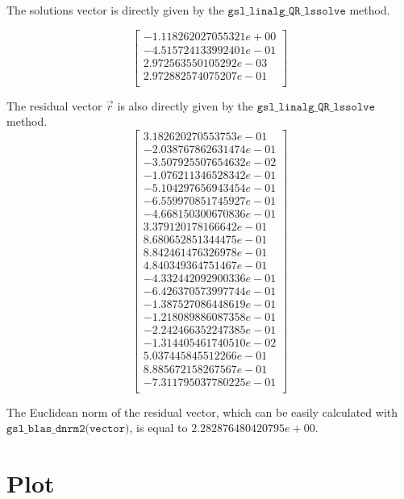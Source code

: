 \documentclass{article}
\newcommand{\code}{\texttt}
\begin{document}
The solutions vector is directly given by the $\code{gsl\_linalg\_QR\_lssolve}$ method.

$$
\begin{bmatrix}
-1.118262027055321e+00\\
-4.515724133992401e-01\\
2.972563550105292e-03\\
2.972882574075207e-01\\
\end{bmatrix}
$$

The residual vector $\vec{r}$ is also directly given by the $\code{gsl\_linalg\_QR\_lssolve}$ method.
$$
\begin{bmatrix}
3.182620270553753e-01\\
-2.038767862631474e-01\\
-3.507925507654632e-02\\
-1.076211346528342e-01\\
-5.104297656943454e-01\\
-6.559970851745927e-01\\
-4.668150300670836e-01\\
3.379120178166642e-01\\
8.680652851344475e-01\\
8.842461476326978e-01\\
4.840349364751467e-01\\
-4.332442092900336e-01\\
-6.426370573997744e-01\\
-1.387527086448619e-01\\
-1.218089886087358e-01\\
-2.242466352247385e-01\\
-1.314405461740510e-02\\
5.037445845512266e-01\\
8.885672158267567e-01\\
-7.311795037780225e-01\\
\end{bmatrix} 
$$

The Euclidean norm of the residual vector, which can be easily calculated with $\code{gsl\_blas\_dnrm2(vector)}$, is equal to $2.282876480420795e+00$.
\section{Plot}
\end{document}
